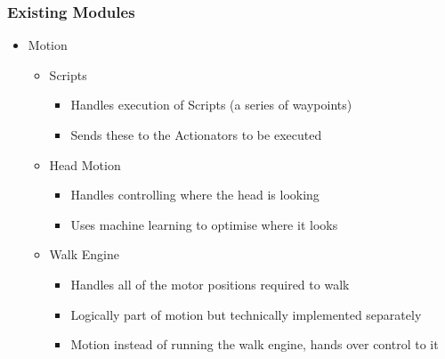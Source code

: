 \documentclass{beamer}
\begin{document}
\begin{frame}
    \frametitle{Existing Modules}
	\begin{itemize}
		\item Motion
			\begin{itemize}
				\item Scripts
					\begin{itemize}
						\item Handles execution of Scripts (a series of waypoints)
						\item Sends these to the Actionators to be executed
					\end{itemize}
				\item Head Motion
					\begin{itemize}
						\item Handles controlling where the head is looking
						\item Uses machine learning to optimise where it looks
					\end{itemize}
				\item Walk Engine
					\begin{itemize}
						\item Handles all of the motor positions required to walk
						\item Logically part of motion but technically implemented separately
						\item Motion instead of running the walk engine, hands over control to it
					\end{itemize}
			\end{itemize}
	\end{itemize}
\end{frame}
\end{document}
